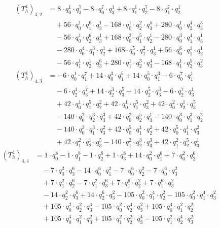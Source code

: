 \begin{align*}(T_{h}^4)_{4,2}&=8\cdot q_0^{1}\cdot q_3^{7}-8\cdot q_0^{7}\cdot q_3^{1}+8\cdot q_1^{1}\cdot q_2^{7}-8\cdot q_1^{7}\cdot q_2^{1}\\
&\quad +56\cdot q_0^{1}\cdot q_1^{6}\cdot q_3^{1}-168\cdot q_0^{1}\cdot q_2^{2}\cdot q_3^{5}+280\cdot q_0^{1}\cdot q_2^{4}\cdot q_3^{3}\\
&\quad -56\cdot q_0^{1}\cdot q_2^{6}\cdot q_3^{1}+168\cdot q_0^{2}\cdot q_1^{5}\cdot q_2^{1}-280\cdot q_0^{3}\cdot q_1^{4}\cdot q_3^{1}\\
&\quad -280\cdot q_0^{4}\cdot q_1^{3}\cdot q_2^{1}+168\cdot q_0^{5}\cdot q_1^{2}\cdot q_3^{1}+56\cdot q_0^{6}\cdot q_1^{1}\cdot q_2^{1}\\
&\quad -56\cdot q_1^{1}\cdot q_2^{1}\cdot q_3^{6}+280\cdot q_1^{1}\cdot q_2^{3}\cdot q_3^{4}-168\cdot q_1^{1}\cdot q_2^{5}\cdot q_3^{2}\end{align*}
\begin{align*}(T_{h}^4)_{4,3}&=-6\cdot q_0^{1}\cdot q_1^{7}+14\cdot q_0^{3}\cdot q_1^{5}+14\cdot q_0^{5}\cdot q_1^{3}-6\cdot q_0^{7}\cdot q_1^{1}\\
&\quad -6\cdot q_2^{1}\cdot q_3^{7}+14\cdot q_2^{3}\cdot q_3^{5}+14\cdot q_2^{5}\cdot q_3^{3}-6\cdot q_2^{7}\cdot q_3^{1}\\
&\quad +42\cdot q_0^{1}\cdot q_1^{5}\cdot q_2^{2}+42\cdot q_0^{1}\cdot q_1^{5}\cdot q_3^{2}+42\cdot q_0^{2}\cdot q_2^{1}\cdot q_3^{5}\\
&\quad -140\cdot q_0^{2}\cdot q_2^{3}\cdot q_3^{3}+42\cdot q_0^{2}\cdot q_2^{5}\cdot q_3^{1}-140\cdot q_0^{3}\cdot q_1^{3}\cdot q_2^{2}\\
&\quad -140\cdot q_0^{3}\cdot q_1^{3}\cdot q_3^{2}+42\cdot q_0^{5}\cdot q_1^{1}\cdot q_2^{2}+42\cdot q_0^{5}\cdot q_1^{1}\cdot q_3^{2}\\
&\quad +42\cdot q_1^{2}\cdot q_2^{1}\cdot q_3^{5}-140\cdot q_1^{2}\cdot q_2^{3}\cdot q_3^{3}+42\cdot q_1^{2}\cdot q_2^{5}\cdot q_3^{1}\end{align*}
\begin{align*}(T_{h}^4)_{4,4}&=1\cdot q_0^{8}-1\cdot q_1^{8}-1\cdot q_2^{8}+1\cdot q_3^{8}+14\cdot q_0^{2}\cdot q_1^{6}+7\cdot q_0^{2}\cdot q_2^{6}\\
&\quad -7\cdot q_0^{2}\cdot q_3^{6}-14\cdot q_0^{6}\cdot q_1^{2}-7\cdot q_0^{6}\cdot q_2^{2}-7\cdot q_0^{6}\cdot q_3^{2}\\
&\quad +7\cdot q_1^{2}\cdot q_2^{6}-7\cdot q_1^{2}\cdot q_3^{6}+7\cdot q_1^{6}\cdot q_2^{2}+7\cdot q_1^{6}\cdot q_3^{2}\\
&\quad -14\cdot q_2^{2}\cdot q_3^{6}+14\cdot q_2^{6}\cdot q_3^{2}-105\cdot q_0^{2}\cdot q_1^{4}\cdot q_2^{2}-105\cdot q_0^{2}\cdot q_1^{4}\cdot q_3^{2}\\
&\quad +105\cdot q_0^{2}\cdot q_2^{2}\cdot q_3^{4}-105\cdot q_0^{2}\cdot q_2^{4}\cdot q_3^{2}+105\cdot q_0^{4}\cdot q_1^{2}\cdot q_2^{2}\\
&\quad +105\cdot q_0^{4}\cdot q_1^{2}\cdot q_3^{2}+105\cdot q_1^{2}\cdot q_2^{2}\cdot q_3^{4}-105\cdot q_1^{2}\cdot q_2^{4}\cdot q_3^{2}\end{align*}
